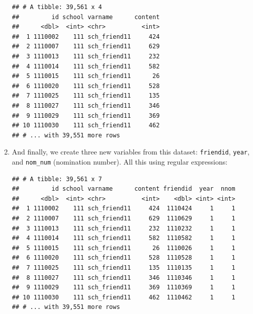 \documentclass[]{book}
\newenvironment{Shaded}{\begin{snugshade}}{\end{snugshade}}
\newcommand{\KeywordTok}[1]{\textcolor[rgb]{0.13,0.29,0.53}{\textbf{#1}}}
\newcommand{\DataTypeTok}[1]{\textcolor[rgb]{0.13,0.29,0.53}{#1}}
\newcommand{\DecValTok}[1]{\textcolor[rgb]{0.00,0.00,0.81}{#1}}
\newcommand{\StringTok}[1]{\textcolor[rgb]{0.31,0.60,0.02}{#1}}
\newcommand{\OperatorTok}[1]{\textcolor[rgb]{0.81,0.36,0.00}{\textbf{#1}}}
\newcommand{\NormalTok}[1]{#1}
\theoremstyle{definition}
\theoremstyle{definition}
\theoremstyle{definition}
\theoremstyle{remark}
\begin{document}
\begin{enumerate}
\begin{verbatim}
## # A tibble: 39,561 x 4
##         id school varname      content
##      <dbl>  <int> <chr>          <int>
##  1 1110002    111 sch_friend11     424
##  2 1110007    111 sch_friend11     629
##  3 1110013    111 sch_friend11     232
##  4 1110014    111 sch_friend11     582
##  5 1110015    111 sch_friend11      26
##  6 1110020    111 sch_friend11     528
##  7 1110025    111 sch_friend11     135
##  8 1110027    111 sch_friend11     346
##  9 1110029    111 sch_friend11     369
## 10 1110030    111 sch_friend11     462
## # ... with 39,551 more rows
\end{verbatim}
\item
  And finally, we create three new variables from this dataset:
  \texttt{friendid}, \texttt{year}, and \texttt{nom\_num} (nomination
  number). All this using regular expressions:

\begin{Shaded}
\end{Shaded}

\begin{verbatim}
## # A tibble: 39,561 x 7
##         id school varname      content friendid  year  nnom
##      <dbl>  <int> <chr>          <int>    <dbl> <int> <int>
##  1 1110002    111 sch_friend11     424  1110424     1     1
##  2 1110007    111 sch_friend11     629  1110629     1     1
##  3 1110013    111 sch_friend11     232  1110232     1     1
##  4 1110014    111 sch_friend11     582  1110582     1     1
##  5 1110015    111 sch_friend11      26  1110026     1     1
##  6 1110020    111 sch_friend11     528  1110528     1     1
##  7 1110025    111 sch_friend11     135  1110135     1     1
##  8 1110027    111 sch_friend11     346  1110346     1     1
##  9 1110029    111 sch_friend11     369  1110369     1     1
## 10 1110030    111 sch_friend11     462  1110462     1     1
## # ... with 39,551 more rows
\end{verbatim}


\end{enumerate}
\end{document}
